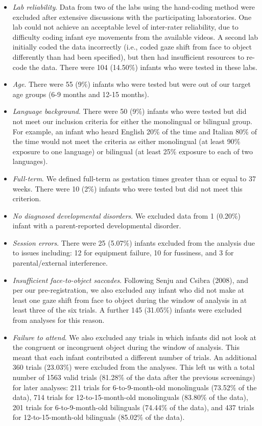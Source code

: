 \documentclass[
  english,
  ,man,floatsintext]{apa6}
\begin{document}
\begin{itemize}
\item
  \emph{Lab reliability}. Data from two of the labs using the hand-coding method were excluded after extensive discussions with the participating laboratories. One lab could not achieve an acceptable level of inter-rater reliability, due to difficulty coding infant eye movements from the available videos. A second lab initially coded the data incorrectly (i.e., coded gaze shift from face to object differently than had been specified), but then had insufficient resources to re-code the data. There were 104 (14.50\%) infants who were tested in these labs.
\item
  \emph{Age}. There were 55 (9\%) infants who were tested but were out of our target age groups (6-9 months and 12-15 months).
\item
  \emph{Language background}. There were 50 (9\%) infants who were tested but did not meet our inclusion criteria for either the monolingual or bilingual group. For example, an infant who heard English 20\% of the time and Italian 80\% of the time would not meet the criteria as either monolingual (at least 90\% exposure to one language) or bilingual (at least 25\% exposure to each of two languages).
\item
  \emph{Full-term}. We defined full-term as gestation times greater than or equal to 37 weeks. There were 10 (2\%) infants who were tested but did not meet this criterion.
\item
  \emph{No diagnosed developmental disorders}. We excluded data from 1 (0.20\%) infant with a parent-reported developmental disorder.
\item
  \emph{Session errors}. There were 25 (5.07\%) infants excluded from the analysis due to issues including: 12 for equipment failure, 10 for fussiness, and 3 for parental/external interference.
\item
  \emph{Insufficient face-to-object saccades}. Following Senju and Csibra (2008), and per our pre-registration, we also excluded any infant who did not make at least one gaze shift from face to object during the window of analysis in at least three of the six trials. A further 145 (31.05\%) infants were excluded from analyses for this reason.
\item
  \emph{Failure to attend}. We also excluded any trials in which infants did not look at the congruent or incongruent object during the window of analysis. This meant that each infant contributed a different number of trials. An additional 360 trials (23.03\%) were excluded from the analyses. This left us with a total number of 1563 valid trials (81.28\% of the data after the previous screenings) for later analyses: 211 trials for 6-to-9-month-old monolinguals (73.52\% of the data), 714 trials for 12-to-15-month-old monolinguals (83.80\% of the data), 201 trials for 6-to-9-month-old bilinguals (74.44\% of the data), and 437 trials for 12-to-15-month-old bilinguals (85.02\% of the data).
\end{itemize}
\end{document}
